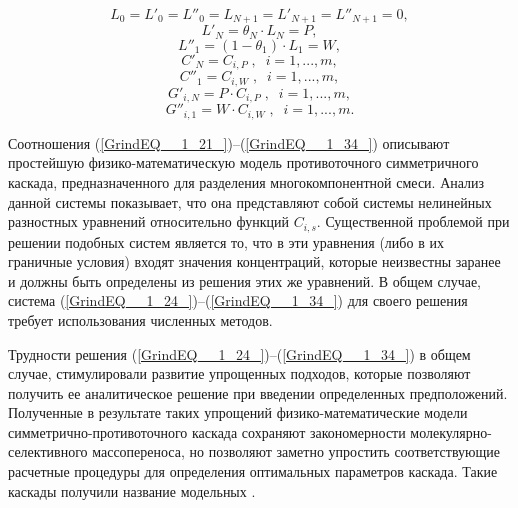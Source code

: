 \begin{equation} \label{GrindEQ__1_28_} 
  L_{0} =L'_{0} =L''_{0} =L_{N+1} =L'_{N+1} =L''_{N+1} =0, 
  \end{equation} 
  \begin{equation} \label{GrindEQ__1_29_} 
  L'_{N} =\theta _{N} \cdot L_{N} =P,        
  \end{equation} 
  \begin{equation} \label{GrindEQ__1_30_} 
  L''_{1} =(1-\theta _{1} )\cdot L_{1} =W,        
  \end{equation} 
  \begin{equation} \label{GrindEQ__1_31_} 
  C'_{N} =C_{i,P} \;, \; \;  i=1,...,m, 
  \end{equation} 
  \begin{equation} \label{GrindEQ__1_32_} 
  C''_{1} =C_{i,W} \;, \; \;  i=1,...,m, 
  \end{equation} 
  \begin{equation} \label{GrindEQ__1_33_} 
  G'_{i,N} =P \cdot C_{i,P} \; , \; \; i=1,...,m, 
  \end{equation} 
  \begin{equation} \label{GrindEQ__1_34_} 
  G''_{i,1} =W \cdot C_{i,W} \;, \; \; i=1,...,m. 
\end{equation} 

Соотношения (\ref{GrindEQ__1_21_})--(\ref{GrindEQ__1_34_}) описывают простейшую физико-математическую модель противоточного симметричного каскада, предназначенного для разделения многокомпонентной смеси. Анализ данной системы показывает, что она представляют собой системы нелинейных разностных уравнений относительно функций $C_{i,s}$. Существенной проблемой при решении подобных систем является то, что в эти уравнения (либо в их граничные условия) входят значения концентраций, которые неизвестны заранее и должны быть определены из решения этих же уравнений. В общем случае, система (\ref{GrindEQ__1_24_})--(\ref{GrindEQ__1_34_}) для своего решения требует использования численных методов.

Трудности решения (\ref{GrindEQ__1_24_})--(\ref{GrindEQ__1_34_}) в общем случае, стимулировали развитие упрощенных подходов, которые позволяют получить ее аналитическое решение при введении определенных предположений. Полученные в результате таких упрощений физико-математические модели симметрично-противоточного каскада сохраняют закономерности молекулярно-селективного массопереноса, но позволяют заметно упростить соответствующие расчетные процедуры для определения оптимальных параметров каскада. Такие каскады получили название модельных \cite{minenkoTeoriiKaskadovDlya1965, delagarzaMulticomponentIsotopeSeparation1961, zhigalovskiyLekcionnyeMaterialyPo1999, kolokoltsovDesignCascadesSeparating1970, kolokolcovVoprosuPostroeniiKaskadov1970, minenkoPredelnoeObogashcheniePromezhutochnyh1972, yamamotoMulticomponentIsotopeSeparating1978, wuStudyMulticomponentIsotope, borisevichRascheteKaskadovDopolnitelnym1993, woodCriterionEffiencyMultiisotope1999, sulaberidzeOsobennostiObogashcheniyaKomponentov2006, sazykinKvaziidealnyeKaskadyDlya2000, sulaberidzeSravnenieOptimalnyhModelnyh2008}.

